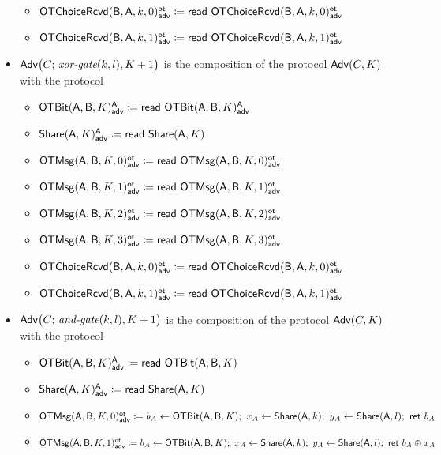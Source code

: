 \begin{itemize}
\begin{itemize}
\item {\color{blue} $\LeakOTChoiceRcvd(\B,\A,k,0)^\ot_\adv \coloneqq \read{\LeakOTChoiceRcvd(\B,\A,k,0)^\ot_\adv}$}
\item {\color{blue} $\LeakOTChoiceRcvd(\B,\A,k,1)^\ot_\adv \coloneqq \read{\LeakOTChoiceRcvd(\B,\A,k,1)^\ot_\adv}$}
\end{itemize}
\item $\Adv\big(C; \, \xorgate(k,l),K+1\big)$ is the composition of the protocol $\Adv(C,K)$ with the protocol
\begin{itemize}
\item {\color{blue} $\LeakOTBit(\A,\B,K)^\A_\adv \coloneqq \read{\LeakOTBit(\A,\B,K)^\A_\adv}$}
\item {\color{blue} $\LeakShare(\A,K)^\A_\adv \coloneqq \read{\Share(\A,K)}$}\medskip
\item {\color{blue} $\LeakOTMsg(\A,\B,K,0)^\ot_\adv \coloneqq \read{\LeakOTMsg(\A,\B,K,0)^\ot_\adv}$}
\item {\color{blue} $\LeakOTMsg(\A,\B,K,1)^\ot_\adv \coloneqq \read{\LeakOTMsg(\A,\B,K,1)^\ot_\adv}$}
\item {\color{blue} $\LeakOTMsg(\A,\B,K,2)^\ot_\adv \coloneqq \read{\LeakOTMsg(\A,\B,K,2)^\ot_\adv}$}
\item {\color{blue} $\LeakOTMsg(\A,\B,K,3)^\ot_\adv \coloneqq \read{\LeakOTMsg(\A,\B,K,3)^\ot_\adv}$}\medskip
\item {\color{blue} $\LeakOTChoiceRcvd(\B,\A,k,0)^\ot_\adv \coloneqq \read{\LeakOTChoiceRcvd(\B,\A,k,0)^\ot_\adv}$}
\item {\color{blue} $\LeakOTChoiceRcvd(\B,\A,k,1)^\ot_\adv \coloneqq \read{\LeakOTChoiceRcvd(\B,\A,k,1)^\ot_\adv}$}
\end{itemize}
\item $\Adv\big(C; \, \andgate(k,l),K+1\big)$ is the composition of the protocol $\Adv(C,K)$ with the protocol
\begin{itemize}
\item {\color{blue} $\LeakOTBit(\A,\B,K)^\A_\adv \coloneqq \read{\OTBit(\A,\B,K)}$}
\item {\color{blue} $\LeakShare(\A,K)^\A_\adv \coloneqq \read{\Share(\A,K)}$}\medskip
\item {\color{blue} $\LeakOTMsg(\A,\B,K,0)^\ot_\adv \coloneqq b_A \leftarrow \OTBit(\A,\B,K); \ x_A \leftarrow \Share(\A,k); \ y_A \leftarrow \Share(\A,l); \ \ret{b_A}$}
\item {\color{blue} $\LeakOTMsg(\A,\B,K,1)^\ot_\adv \coloneqq b_A \leftarrow \OTBit(\A,\B,K); \ x_A \leftarrow \Share(\A,k); \ y_A \leftarrow \Share(\A,l); \ \ret{b_A \oplus x_A}$}

\end{itemize}
\end{itemize}
